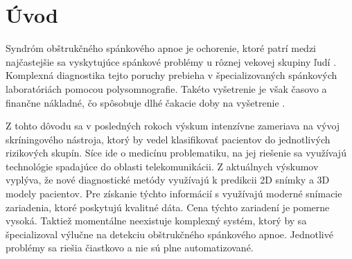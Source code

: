 
\setcounter{page}{1} %
\chapter{Úvod} \label{kap:Uvod}

\pagestyle{fancy}
\fancyhf{}
\fancyfoot[CE,CO]{\thepage}
\renewcommand{\footrulewidth}{1pt}


Syndróm obštrukčného spánkového apnoe je ochorenie, ktoré patrí medzi najčastejšie sa
vyskytujúce spánkové problémy u rôznej vekovej skupiny ľudí \cite{lam2010obstructive}. Komplexná diagnostika tejto poruchy prebieha v špecializovaných spánkových laboratóriách pomocou polysomnografie. Takéto vyšetrenie je však časovo a finančne nákladné, čo spôsobuje dlhé čakacie doby na vyšetrenie \cite{lam2005craniofacial}.

Z tohto dôvodu sa v posledných rokoch výskum intenzívne zameriava na vývoj skríningového nástroja, ktorý by vedel klasifikovať pacientov do jednotlivých rizikových skupín. Síce ide o medicínu problematiku, na jej riešenie sa využívajú technológie spadajúce do oblasti telekomunikácii. Z aktuálnych výskumov vyplýva, že nové diagnostické metódy využívajú k predikcii 2D snímky a 3D modely pacientov.  
Pre získanie týchto informácií s využívajú moderné snímacie zariadenia, ktoré poskytujú kvalitné dáta. Cena týchto zariadení je pomerne vysoká. Taktiež momentálne neexistuje komplexný systém, ktorý by sa špecializoval výlučne na detekciu obštrukčného spánkového apnoe. Jednotlivé problémy sa riešia čiastkovo a nie sú plne automatizované.     

